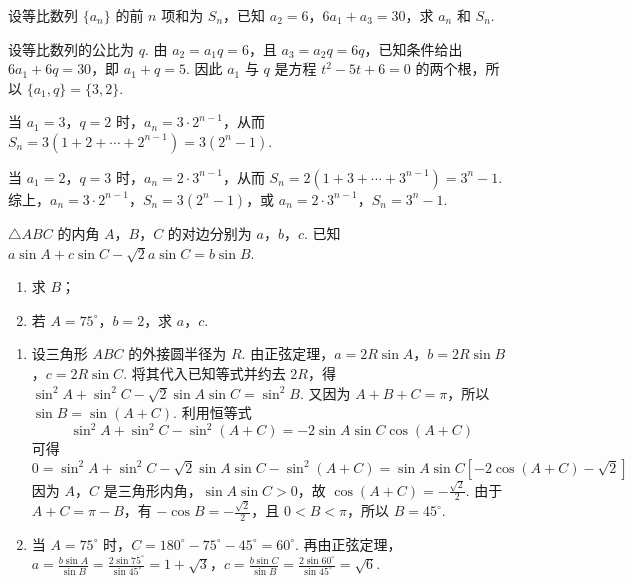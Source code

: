 \begin{problem}
设等比数列 \(\{a_n\}\) 的前 \(n\) 项和为 \(S_n\)，已知 \(a_2=6\)，\(6a_1+a_3=30\)，求 \(a_n\) 和 \(S_n\).
\end{problem}

\begin{solution}
设等比数列的公比为 \(q\). 由 \(a_2=a_1q=6\)，且 \(a_3=a_2q=6q\)，已知条件给出 \(6a_1+6q=30\)，即 \(a_1+q=5\). 因此 \(a_1\) 与 \(q\) 是方程 \(t^2-5t+6=0\) 的两个根，所以 \(\{a_1,q\}=\{3,2\}\).

当 \(a_1=3\)，\(q=2\) 时，\(a_n=3\cdot2^{n-1}\)，从而 \(S_n=3(1+2+\cdots+2^{n-1})=3(2^n-1)\).

当 \(a_1=2\)，\(q=3\) 时，\(a_n=2\cdot3^{n-1}\)，从而 \(S_n=2(1+3+\cdots+3^{n-1})=3^n-1\). 综上，\(a_n=3\cdot2^{n-1}\)，\(S_n=3(2^n-1)\)，或 \(a_n=2\cdot3^{n-1}\)，\(S_n=3^n-1\).
\end{solution}

\begin{problem}
\(\triangle ABC\) 的内角 \(A\)，\(B\)，\(C\) 的对边分别为 \(a\)，\(b\)，\(c\). 已知 \(a\sin A+c\sin C-\sqrt{2}a\sin C=b\sin B\).

\begin{enumerate}
\item 求 \(B\)；
\item 若 \(A=75^{\circ}\)，\(b=2\)，求 \(a\)，\(c\).
\end{enumerate}
\end{problem}

\begin{solution}
\begin{enumerate}
\item 设三角形 \(ABC\) 的外接圆半径为 \(R\). 由正弦定理，\(a=2R\sin A\)，\(b=2R\sin B\)，\(c=2R\sin C\). 将其代入已知等式并约去 \(2R\)，得 \(\sin^2A+\sin^2C-\sqrt{2}\sin A\sin C=\sin^2B\). 又因为 \(A+B+C=\pi\)，所以 \(\sin B=\sin(A+C)\). 利用恒等式
\[
\sin^2A+\sin^2C-\sin^2(A+C)=-2\sin A\sin C\cos(A+C)
\]
可得
\[
0=\sin^2A+\sin^2C-\sqrt{2}\sin A\sin C-\sin^2(A+C)=\sin A\sin C\left[-2\cos(A+C)-\sqrt{2}\right]
\]
因为 \(A\)，\(C\) 是三角形内角，\(\sin A\sin C>0\)，故 \(\cos(A+C)=-\frac{\sqrt{2}}{2}\). 由于 \(A+C=\pi-B\)，有 \(-\cos B=-\frac{\sqrt{2}}{2}\)，且 \(0<B<\pi\)，所以 \(B=45^{\circ}\).

\item 当 \(A=75^{\circ}\) 时，\(C=180^{\circ}-75^{\circ}-45^{\circ}=60^{\circ}\). 再由正弦定理，\(a=\frac{b\sin A}{\sin B}=\frac{2\sin75^{\circ}}{\sin45^{\circ}}=1+\sqrt{3}\)，\(c=\frac{b\sin C}{\sin B}=\frac{2\sin60^{\circ}}{\sin45^{\circ}}=\sqrt{6}\).
\end{enumerate}
\end{solution}

